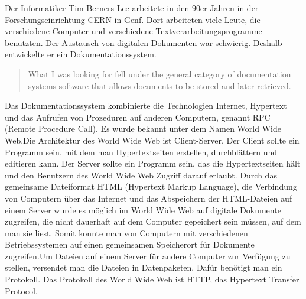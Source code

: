 \documentclass{llncs}
\begin{document}
Der Informatiker Tim Berners-Lee arbeitete in den 90er Jahren in der Forschungseinrichtung CERN in Genf. Dort arbeiteten viele Leute, die verschiedene Computer und verschiedene Textverarbeitungsprogramme benutzten. Der Austausch von digitalen Dokumenten war schwierig. Deshalb entwickelte er ein Dokumentationssystem. \begin{quote}What I was looking for fell under the general category of documentation systems-software that allows documents to be stored and later retrieved. \cite{Berners-Lee1999} \end{quote}
Das Dokumentationssystem kombinierte die Technologien Internet, Hypertext und das Aufrufen von Prozeduren auf anderen Computern, genannt RPC (Remote Procedure Call). Es wurde bekannt unter dem Namen World Wide Web.\newline Die Architektur des World Wide Web ist Client-Server. Der Client sollte ein Programm sein, mit dem man Hypertextseiten erstellen, durchblättern und editieren kann. Der Server sollte ein Programm sein, das die Hypertextseiten hält und den Benutzern des World Wide Web Zugriff darauf erlaubt. 
Durch das gemeinsame Dateiformat HTML (Hypertext Markup Language), die Verbindung von Computern über das Internet und das Abspeichern der HTML-Dateien auf einem Server wurde es möglich im World Wide Web auf digitale Dokumente zugreifen, die nicht dauerhaft auf dem Computer gepeichert sein müssen, auf dem man sie liest. Somit konnte man von Computern mit verschiedenen Betriebssystemen auf einen gemeinsamen Speicherort für Dokumente zugreifen.\newline Um Dateien auf einem Server für andere Computer zur Verfügung zu stellen, versendet man die Dateien in Datenpaketen. Dafür benötigt man ein Protokoll. Das Protokoll des World Wide Web ist HTTP, das Hypertext Transfer Protocol.
\end{document}
